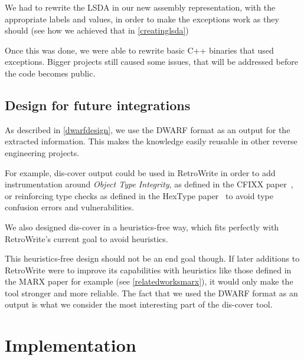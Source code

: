 \documentclass[a4paper,11pt,oneside]{report}
\newcommand{\lou}[1]{\todo[inline,color=green!40]{Louis: #1}}
\begin{document}
We had to rewrite the LSDA in our new assembly representation, with the
appropriate labels and values, in order to make the exceptions work as they
should (see how we achieved that in \autoref{creatinglsda})

Once this was done, we were able to rewrite basic C++ binaries that used
exceptions.
Bigger projects still caused some issues, that will be addressed
before the code becomes public.


\section{Design for future integrations}

As described in \autoref{dwarfdesign}, we use the DWARF format as an output
for the extracted information. This makes the knowledge easily reusable in
other reverse engineering projects.

For example, dis-cover output could be used in RetroWrite in order to add
instrumentation around \emph{Object Type Integrity}, as defined in the CFIXX
paper~\cite{cfixx}, or reinforcing type checks as defined in the HexType
paper~\cite{hextype} to avoid type confusion errors and vulnerabilities.

\lou{TODO link to that}

We also designed dis-cover in a heuristics-free way, which fits perfectly with
RetroWrite's current goal to avoid heuristics.

This heuristics-free design should not be an end goal though.
If later additions to RetroWrite were to improve its capabilities with
heuristics like those defined in the MARX paper for example (see
\autoref{relatedworksmarx}), it would only make the tool stronger and more
reliable.
The fact that we used the DWARF format as an output is what we consider the
most interesting part of the dis-cover tool.


\chapter{Implementation}


\end{document}
